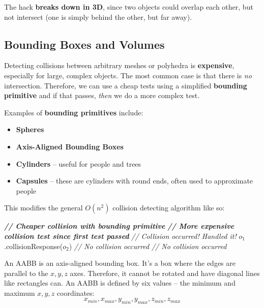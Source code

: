 \documentclass{article}
\begin{document}
The hack \textbf{breaks down in 3D}, since two objects could overlap each other, but not intersect (one is simply behind the other, but far away).

\subsection{Bounding Boxes and Volumes}

Detecting collisions between arbitrary meshes or polyhedra is \textbf{expensive}, especially for large, complex objects. The most common case is that there is \textit{no} intersection. Therefore, we can use a cheap tests using a simplified \textbf{bounding primitive} and if that passes, \textit{then} we do a more complex test.

Examples of \textbf{bounding primitives} include:
\begin{itemize}
	\item \textbf{Spheres}
	\item \textbf{Axis-Aligned Bounding Boxes}
	\item \textbf{Cylinders} -- useful for people and trees
	\item \textbf{Capsules} -- these are cylinders with round ends, often used to approximate people
\end{itemize}

This modifies the general $O(n^2)$ collision detecting algorithm like so:
\begin{algorithmic}[1]
		\STATE \textbf{\textit{// Cheaper collision with bounding primitive}}
			\STATE \textbf{\textit{// More expensive collision test since first test passed}}
				\STATE \textit{// Collision occurred! Handled it!}
				\STATE $o_1$.collisionResponse($o_2$)
			\ELSE
				\STATE \textit{// No collision occurred}
			\ENDIF				
		\ELSE
			\STATE \textit{// No collision occurred}
		\ENDIF
	\ENDFOR
\ENDFOR
\end{algorithmic}

An AABB is an axis-aligned bounding box. It's a box where the edges are parallel to the $x,y,z$ axes. Therefore, it cannot be rotated and have diagonal lines like rectangles can. An AABB is defined by six values – the minimum and maximum $x,y,z$ coordinates:
\begin{equation}
	x_{min}, x_{max}, y_{min}, y_{max}, z_{min}, z_{max}
\end{equation}
\end{document}
